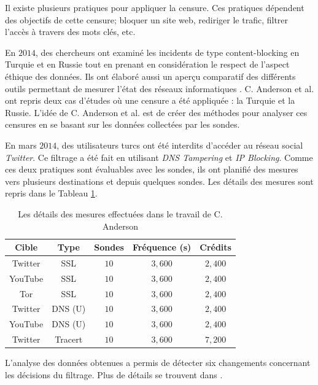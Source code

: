 Il existe plusieurs pratiques pour appliquer la censure. Ces pratiques dépendent des objectifs de cette censure; bloquer un site web, rediriger le trafic, filtrer l'accès à travers des mots clés, etc.

En $2014$, des chercheurs ont examiné les incidents de type content-blocking en Turquie et en  Russie tout en prenant en considération le respect de l'aspect éthique des données. Ils ont  élaboré aussi un aperçu comparatif des différents outils permettant de mesurer l'état des réseaux informatiques \cite{Collin-Anderson}. C. Anderson et al. ont repris deux cas d'études où une censure a été appliquée : la Turquie et la Russie. L'idée de C. Anderson et al. est de créer des méthodes pour analyser ces censures en se basant sur les données collectées par les sondes. \par



En mars $2014$, des utilisateurs turcs ont été interdits d'accéder au réseau social  \textit{Twitter}.  Ce filtrage a été fait en utilisant \textit{DNS Tampering} et \textit{IP Blocking}. Comme ces deux pratiques sont évaluables avec les sondes, ils ont planifié des mesures vers plusieurs destinations et depuis quelques  sondes. Les détails des mesures sont  repris  dans le Tableau  \ref{ta:censorship-colin}.
\begin{table}[H]
	\centering
	\captionsetup{justification=centering}
	\begin{tabular}{ c c c c c}
		\textbf{Cible} &\textbf{Type} &	\textbf{Sondes} &\textbf{Fréquence (s)}	& \textbf{Crédits} \\ \hline
		Twitter &SSL &$ 10 $ &$ 3,600 $ &$ 2,400 $\\ \hline
		YouTube &SSL &$ 10 $ &$ 3,600 $ &$ 2,400 $ \\ \hline
		Tor & SSL &$ 10 $ &$ 3,600 $ &$ 2,400 $ \\ \hline
		Twitter & DNS (U) &$ 10 $ &$ 3,600 $ &$ 2,400 $ \\ \hline
		YouTube & DNS (U) &$ 10 $ &$ 3,600 $ &$ 2,400 $ \\ \hline
		Twitter &Tracert &$ 10 $ &$ 3,600 $ & $ 7,200 $ \\ \hline
	\end{tabular}
	\caption{Les détails des mesures effectuées dans le travail de C. Anderson \cite{Collin-Anderson} }
	\label{ta:censorship-colin}
\end{table}
L'analyse des données obtenues a permis de  détecter  six changements concernant les décisions du filtrage. Plus de détails se trouvent dans \cite{Collin-Anderson}.

